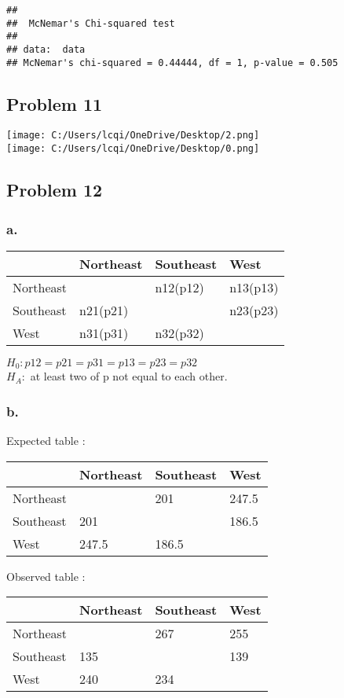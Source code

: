 \documentclass[]{article}
\begin{document}
\begin{verbatim}
## 
##  McNemar's Chi-squared test
## 
## data:  data
## McNemar's chi-squared = 0.44444, df = 1, p-value = 0.505
\end{verbatim}

\subsection{Problem 11}\label{problem-11}

\texttt{[image: C:/Users/lcqi/OneDrive/Desktop/2.png]}\\
\texttt{[image: C:/Users/lcqi/OneDrive/Desktop/0.png]}

\subsection{Problem 12}\label{problem-12}

\subsubsection{a.}\label{a.-4}

\begin{longtable}[]{@{}llll@{}}
\toprule
& Northeast & Southeast & West\tabularnewline
\midrule
\endhead
Northeast & & n12(p12) & n13(p13)\tabularnewline
Southeast & n21(p21) & & n23(p23)\tabularnewline
West & n31(p31) & n32(p32) &\tabularnewline
\bottomrule
\end{longtable}

\(H_0 : p12=p21=p31=p13=p23=p32\)\\
\(H_A :\) at least two of p not equal to each other.

\subsubsection{b.}\label{b.-4}

Expected table :

\begin{longtable}[]{@{}llll@{}}
\toprule
& Northeast & Southeast & West\tabularnewline
\midrule
\endhead
Northeast & & 201 & 247.5\tabularnewline
Southeast & 201 & & 186.5\tabularnewline
West & 247.5 & 186.5 &\tabularnewline
\bottomrule
\end{longtable}

Observed table :

\begin{longtable}[]{@{}llll@{}}
\toprule
& Northeast & Southeast & West\tabularnewline
\midrule
\endhead
Northeast & & 267 & 255\tabularnewline
Southeast & 135 & & 139\tabularnewline
West & 240 & 234 &\tabularnewline
\bottomrule
\end{longtable}
\end{document}
